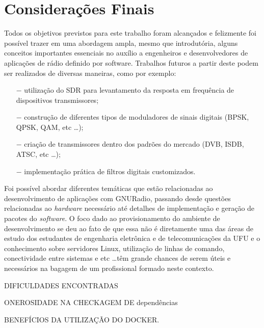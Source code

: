 \documentclass[
  12pt,				%
  openright,			%
  twoside,			%
  a4paper,			%
  english,			%
  french,				%
  spanish,			%
  brazil,				%
  ]{abntex2}
\begin{document}
\chapter{Considerações Finais}

Todos os objetivos previstos para este trabalho foram alcançados e felizmente foi possível trazer em uma abordagem ampla, mesmo que introdutória, alguns conceitos importantes essenciais
no auxílio a engenheiros e desenvolvedores de aplicações de rádio definido por software. Trabalhos futuros a partir deste podem ser realizados de diversas maneiras, como por exemplo:

\begin{itemize}
  \item[$-$] utilização do SDR para levantamento da resposta em frequência de dispositivos transmissores;
  \item[$-$] construção de diferentes tipos de moduladores de sinais digitais (BPSK, QPSK, QAM, etc \ldots);
  \item[$-$] criação de transmissores dentro dos padrões do mercado (DVB, ISDB, ATSC, etc \ldots);
  \item[$-$] implementação prática de filtros digitais customizados.
\end{itemize}

Foi possível abordar diferentes temáticas que estão relacionadas ao desenvolvimento de aplicações com GNURadio, passando desde questões relacionadas ao \textit{hardware} necessário até detalhes
de implementação e geração de pacotes do \textit{software}. O foco dado ao provisionamento do ambiente de desenvolvimento se deu ao fato de que essa não é diretamente uma das áreas de estudo dos
estudantes de engenharia eletrônica e de telecomunicações da UFU e o conhecimento sobre servidores Linux, utilização de linhas de comando, conectividade entre sistemas e etc \ldots têm grande chances
de serem úteis e necessários na bagagem de um profissional formado neste contexto.

DIFICULDADES ENCONTRADAS

ONEROSIDADE NA CHECKAGEM DE dependências

BENEFÍCIOS DA UTILIZAÇÃO DO DOCKER.



\postextual


\end{document}
